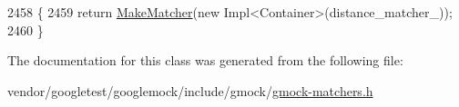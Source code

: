 \begin{DoxyCode}
2458                                       \{
2459     \textcolor{keywordflow}{return} \hyperlink{namespacetesting_a37fd8029ac00e60952440a3d9cca8166}{MakeMatcher}(\textcolor{keyword}{new} Impl<Container>(distance\_matcher\_));
2460   \}
\end{DoxyCode}


The documentation for this class was generated from the following file\+:\begin{DoxyCompactItemize}
\item 
vendor/googletest/googlemock/include/gmock/\hyperlink{gmock-matchers_8h}{gmock-\/matchers.\+h}\end{DoxyCompactItemize}
